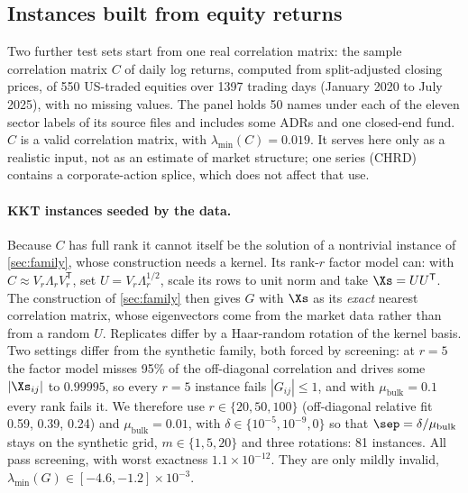 \subsection{Instances built from equity returns}\label{sec:thesis}
Two further test sets start from one real correlation matrix: the sample
correlation matrix $C$ of daily log returns, computed from split-adjusted
closing prices, of 550 US-traded equities over 1397 trading days (January 2020
to July 2025), with no missing values. The panel holds 50 names under each of
the eleven sector labels of its source files and includes some ADRs and one
closed-end fund. $C$ is a valid correlation matrix, with
$\lambda_{\min}(C)=0.019$. It serves here only as a realistic input, not as an
estimate of market structure; one series (CHRD) contains a corporate-action
splice, which does not affect that use.

\paragraph{KKT instances seeded by the data.}
Because $C$ has full rank it cannot itself be the solution of a nontrivial
instance of \cref{sec:family}, whose construction needs a kernel. Its rank-$r$
factor model can: with $C\approx V_r\Lambda_rV_r^{\mathsf T}$, set
$U=V_r\Lambda_r^{1/2}$, scale its rows to unit norm and take $\Xs=UU^{\mathsf T}$.
The construction of \cref{sec:family} then gives $G$ with $\Xs$ as its
\emph{exact} nearest correlation matrix, whose eigenvectors come from the
market data rather than from a random $U$. Replicates differ by a Haar-random
rotation of the kernel basis. Two settings differ from the synthetic family,
both forced by screening: at $r=5$ the factor model misses 95\% of the
off-diagonal correlation and drives some $|\Xs_{ij}|$ to $0.99995$, so every
$r=5$ instance fails $|G_{ij}|\le1$, and with $\mu_{\mathrm{bulk}}=0.1$ every
rank fails it. We therefore use $r\in\{20,50,100\}$ (off-diagonal relative fit
0.59, 0.39, 0.24) and $\mu_{\mathrm{bulk}}=0.01$, with
$\delta\in\{10^{-5},10^{-9},0\}$ so that $\sep=\delta/\mu_{\mathrm{bulk}}$ stays
on the synthetic grid, $m\in\{1,5,20\}$ and three rotations: 81 instances. All
pass screening, with worst exactness $1.1\times10^{-12}$. They are only mildly
invalid, $\lambda_{\min}(G)\in[-4.6,-1.2]\times10^{-3}$.

